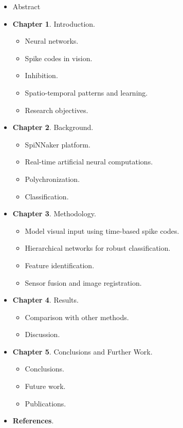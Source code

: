 \begin{multicols}{2}
  \begin{itemize}
      \item Abstract
      \item \textbf{Chapter 1}. Introduction.
      \begin{itemize}
        \item Neural networks.
        \item Spike codes in vision.
        \item Inhibition.
        \item Spatio-temporal patterns and learning.
        \item Research objectives.
      \end{itemize}
      \item \textbf{Chapter 2}. Background.
      \begin{itemize}
        \item SpiNNaker platform.
        \item Real-time artificial neural computations.
        \item Polychronization.
        \item Classification.
      \end{itemize}
      \item \textbf{Chapter 3}. Methodology.
      \begin{itemize}
      \item Model visual input using time-based spike codes.
      \item Hierarchical networks for robust classification.
      \item Feature identification.
      \item Sensor fusion and image registration.
      \end{itemize}
      \item \textbf{Chapter 4}. Results.
      \begin{itemize}
        \item Comparison with other methods.
        \item Discussion.
      \end{itemize}
      \item \textbf{Chapter 5}. Conclusions and Further Work.
      \begin{itemize}
        \item Conclusions.
        \item Future work.
        \item Publications.
      \end{itemize}
      \item \textbf{References}.
      
  \end{itemize}
\end{multicols}